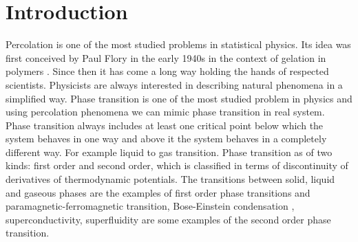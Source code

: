 
\ifpdf
\graphicspath{{Chapter1/Figs/Raster/}{Chapter1/Figs/PDF/}{Chapter1/Figs/}}
\else
\graphicspath{{Chapter1/Figs/Vector/}{Chapter1/Figs/}}
\fi

\chapter{Introduction}  %
	Percolation is one of the most studied problems in statistical physics. Its idea was first conceived by Paul Flory in the early 1940s in the context of gelation in polymers \cite{Flory1941}. Since then it has come a long way holding the hands of respected scientists. Physicists are always interested in describing natural phenomena in a simplified way. Phase transition is one of the most studied problem in physics and using percolation phenomena we can mimic phase transition in real system. Phase transition always includes at least one critical point below which the system behaves in one way and above it the system behaves in a completely different way. For example liquid to gas transition. Phase transition as of two kinds: first order and second order, which is classified in terms of discontinuity of derivatives of thermodynamic potentials.
	The
	transitions between solid, liquid and gaseous phases are the examples of first order
	phase transitions and paramagnetic-ferromagnetic transition, Bose-Einstein condensation \cite{Bose1924}, superconductivity, superfluidity \cite{Landau1941} are some examples of the second order phase
	transition.
	
